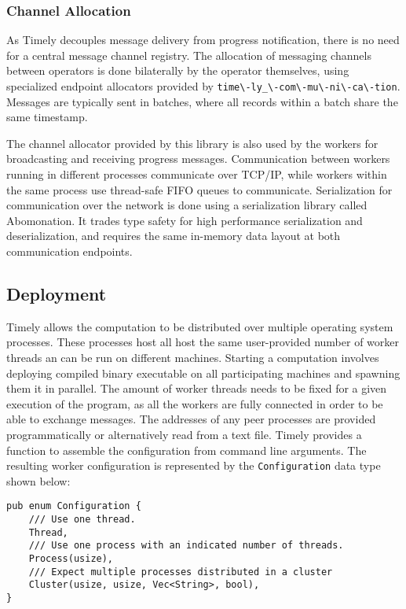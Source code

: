 \subsubsection{Channel Allocation}

As Timely decouples message delivery from progress notification, there is no
need for a central message channel registry. The allocation of messaging
channels between operators is done bilaterally by the operator themselves,
using specialized endpoint allocators provided by
\lstinline{time\-ly_\-com\-mu\-ni\-ca\-tion}. Messages are typically sent in
batches, where all records within a batch share the same timestamp.

The channel allocator provided by this library is also used by the workers for
broadcasting and receiving progress messages. Communication between workers
running in different processes communicate over TCP/IP, while workers within
the same process use thread-safe FIFO queues to communicate.
Serialization for communication over the network is done using a serialization
library called Abomonation. It trades type safety for high performance serialization and 
deserialization, and requires the same in-memory data layout
at both communication endpoints.

\subsection{Deployment}

Timely allows the computation to be distributed over multiple operating system
processes. These processes host all host the same user-provided number of
worker threads an can be run on different machines. Starting a computation
involves deploying compiled binary executable on all participating machines
and spawning them it in parallel.
The amount of worker threads needs to be fixed for a given execution of the
program, as all the workers are fully connected in order to be able to exchange
messages. The addresses of any peer processes are provided programmatically
or alternatively read from a text file. Timely provides a function to assemble
the configuration from command line arguments. The resulting worker configuration
is represented by the \lstinline{Configuration} data type shown below:

\begin{lstlisting}[caption={[Timely's worker configuration data type]
Timely's worker configuration can be one the three options. The parameters in 
\lstinline{Cluster} indicates the number of threads per host, the index
of the local host, the list of all participating hosts and a boolean flag
to enable reporting.}]
pub enum Configuration {
    /// Use one thread.
    Thread,
    /// Use one process with an indicated number of threads.
    Process(usize),
    /// Expect multiple processes distributed in a cluster
    Cluster(usize, usize, Vec<String>, bool),
}
\end{lstlisting}

